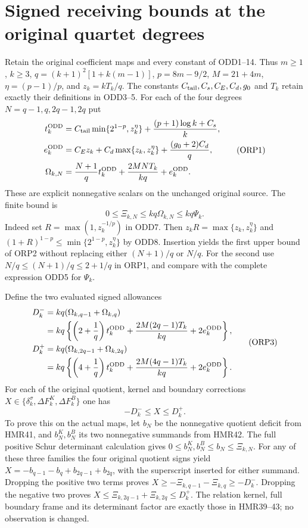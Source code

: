 \section{Signed receiving bounds at the original quartet degrees}

Retain the original coefficient maps and every constant of ODD1--14.
Thus $m\geq1$, $k\geq3$, $q=(k+1)^2[1+k(m-1)]$,
$p=8m-9/2$, $M=21+4m$, $\eta=(p-1)/p$, and
$z_k=kT_k/q$. The constants $C_{\rm tail},C_s,C_E,C_d,g_0$
and $T_k$ retain exactly their definitions in ODD3--5.
For each of the four degrees $N=q-1,q,2q-1,2q$ put
\[
\begin{aligned}
 t_k^{\rm ODD}&=C_{\rm tail}\min\{2^{1-p},z_k^\eta\}
                 +\frac{(p+1)\log k+C_s}{k},\\
 e_k^{\rm ODD}&=C_Ez_k+C_d\max\{z_k,z_k^\eta\}
                       +\frac{(g_0+2)C_d}{q},\\
 \Omega_{k,N}&=\frac{N+1}{q}t_k^{\rm ODD}
                 +\frac{2MNT_k}{kq}+e_k^{\rm ODD}.
\end{aligned}\tag{ORP1}
\]
These are explicit nonnegative scalars on the unchanged original
source. The finite bound is
\[
 0\leq\Xi_{k,N}\leq kq\Omega_{k,N}\leq kq\Psi_k.
 \tag{ORP2}
\]
Indeed set $R=\max(1,z_k^{-1/p})$ in ODD7. Then
$z_kR=\max\{z_k,z_k^\eta\}$ and
$(1+R)^{1-p}\leq\min\{2^{1-p},z_k^\eta\}$ by ODD8.
Insertion yields the first upper bound of ORP2 without replacing
either $(N+1)/q$ or $N/q$. For the second use
$N/q\leq(N+1)/q\leq2+1/q$ in ORP1, and compare with
the complete expression ODD5 for $\Psi_k$.

Define the two evaluated signed allowances
\[
\begin{aligned}
 D_k^-&=kq(\Omega_{k,q-1}+\Omega_{k,q})\\
 &=kq\left\{\left(2+\frac1q\right)t_k^{\rm ODD}
       +\frac{2M(2q-1)T_k}{kq}+2e_k^{\rm ODD}\right\},\\
 D_k^+&=kq(\Omega_{k,2q-1}+\Omega_{k,2q})\\
 &=kq\left\{\left(4+\frac1q\right)t_k^{\rm ODD}
       +\frac{2M(4q-1)T_k}{kq}+2e_k^{\rm ODD}\right\}.
\end{aligned}\tag{ORP3}
\]
For each of the original quotient, kernel and boundary corrections
$X\in\{\delta_k^\sigma,\Delta F_k^K,\Delta F_k^B\}$ one has
\[
 -D_k^-\leq X\leq D_k^+.
 \tag{ORP4}
\]
To prove this on the actual maps, let $b_N$ be the nonnegative
quotient deficit from HMR41, and $b_N^K,b_N^B$ its two
nonnegative summands from HMR42. The full positive Schur
determinant calculation gives $0\leq b_N^K,b_N^B\leq b_N
\leq\Xi_{k,N}$. For any of these three families the four
original quotient signs yield
$X=-b_{q-1}-b_q+b_{2q-1}+b_{2q}$, with the superscript
inserted for either summand. Dropping the positive two terms
proves $X\geq-\Xi_{k,q-1}-\Xi_{k,q}\geq-D_k^-$.
Dropping the negative two proves
$X\leq\Xi_{k,2q-1}+\Xi_{k,2q}\leq D_k^+$.
The relation kernel, full boundary frame and its determinant
factor are exactly those in HMR39--43; no observation is changed.

